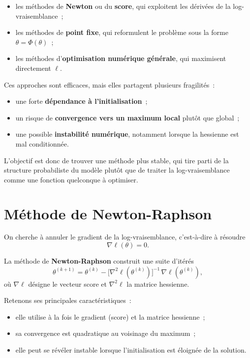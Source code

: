 \begin{itemize}
  \item les méthodes de \textbf{Newton} ou du \textbf{score}, qui exploitent les
        dérivées de la log-vraisemblance~;
  \item les méthodes de \textbf{point fixe}, qui reformulent le problème sous la
        forme $\theta = \Phi(\theta)$~;
  \item les méthodes d'\textbf{optimisation numérique générale}, qui maximisent
        directement $\ell$.
\end{itemize}

Ces approches sont efficaces, mais elles partagent plusieurs fragilités~:

\begin{itemize}
  \item une forte \textbf{dépendance à l'initialisation}~;
  \item un risque de \textbf{convergence vers un maximum local} plutôt que
        global~;
  \item une possible \textbf{instabilité numérique}, notamment lorsque la
        hessienne est mal conditionnée.
\end{itemize}

L'objectif est donc de trouver une méthode plus stable, qui tire parti de la
structure probabiliste du modèle plutôt que de traiter la log-vraisemblance
comme une fonction quelconque à optimiser.

\section{Méthode de Newton-Raphson}

On cherche à annuler le gradient de la log-vraisemblance, c'est-à-dire à résoudre
$$
\nabla \ell(\theta) = 0 .
$$

\begin{mdframed}
\begin{definition}
La méthode de \textbf{Newton-Raphson} construit une suite d'itérés
$$
\theta^{(k+1)} = \theta^{(k)}
  - \big[\nabla^2 \ell(\theta^{(k)})\big]^{-1}\, \nabla \ell(\theta^{(k)}),
$$
où $\nabla \ell$ désigne le vecteur score et $\nabla^2 \ell$ la matrice
hessienne.
\end{definition}
\end{mdframed}

Retenons ses principales caractéristiques~:
\begin{itemize}
  \item elle utilise à la fois le gradient (score) et la matrice hessienne~;
  \item sa convergence est quadratique au voisinage du maximum~;
  \item elle peut se révéler instable lorsque l'initialisation est éloignée de la
        solution.
\end{itemize}


